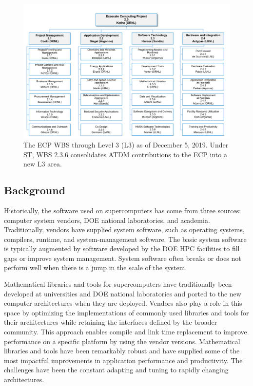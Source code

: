 \begin{figure}
	\centering
	\includegraphics[width=0.9\linewidth]{ECP22}
	\caption{The ECP WBS through Level 3 (L3) as of December 5, 2019. Under ST, WBS 2.3.6 consolidates ATDM contributions to the ECP into a new L3 area.}
	\protect{}
	\label{fig:ecp2}
\end{figure}

\subsection{Background}
Historically, the software used on supercomputers has come from three sources: computer system vendors, DOE national laboratories, and academia. Traditionally, vendors have supplied system software, such as operating systems, compilers, runtime, and system-management software. The basic system software is typically augmented by software developed by the DOE HPC facilities to fill gaps or improve system management. System software often breaks or does not perform well when there is a jump in the scale of the system.
 
Mathematical libraries and tools for supercomputers have traditionally been developed at universities and DOE national laboratories and ported to the new computer architectures when they are deployed. Vendors also play a role in this space by optimizing the implementations of commonly used libraries and tools for their architectures while retaining the interfaces defined by the broader community.  This approach enables compile and link time replacement to improve performance on a specific platform by using the vendor versions.  Mathematical libraries and tools have been remarkably robust and have supplied some of the most impactful improvements in application performance and productivity. The challenges have been the constant adapting and tuning to rapidly changing architectures.
 
